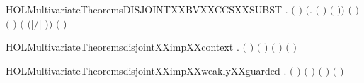 \newcommand{\HOLMultivariateTheoremscontextXXvar}{\UseVerbatim{HOLMultivariateTheoremscontextXXvar}}
\begin{SaveVerbatim}{HOLMultivariateTheoremsDISJOINTXXBVXXCCSXXSUBST}
\HOLTokenTurnstile{} \HOLSymConst{\HOLTokenForall{}}  .
         \HOLSymConst{\HOLTokenConj{}} \ensuremath{(}  \HOLSymConst{\ensuremath{=}}  \ensuremath{)} \HOLSymConst{\HOLTokenConj{}}
        \ensuremath{(}\HOLTokenLambda{}.  \ensuremath{(} \ensuremath{)} \ensuremath{(} \ensuremath{)}\ensuremath{)}  \HOLSymConst{\HOLTokenConj{}}
        \ensuremath{(} \ensuremath{)} \ensuremath{(} \ensuremath{)} \HOLSymConst{\HOLTokenImp{}}
        \ensuremath{(} \ensuremath{(}\ensuremath{[}\ensuremath{/}\ensuremath{]} \ensuremath{)}\ensuremath{)} \ensuremath{(} \ensuremath{)}
\end{SaveVerbatim}
\newcommand{\HOLMultivariateTheoremsDISJOINTXXBVXXCCSXXSUBST}{\UseVerbatim{HOLMultivariateTheoremsDISJOINTXXBVXXCCSXXSUBST}}
\begin{SaveVerbatim}{HOLMultivariateTheoremsdisjointXXimpXXcontext}
\HOLTokenTurnstile{} \HOLSymConst{\HOLTokenForall{}} .
        \ensuremath{(} \ensuremath{)} \ensuremath{(} \ensuremath{)} \HOLSymConst{\HOLTokenConj{}}  \ensuremath{(} \ensuremath{)} \ensuremath{(} \ensuremath{)} \HOLSymConst{\HOLTokenImp{}}
         
\end{SaveVerbatim}
\newcommand{\HOLMultivariateTheoremsdisjointXXimpXXcontext}{\UseVerbatim{HOLMultivariateTheoremsdisjointXXimpXXcontext}}
\begin{SaveVerbatim}{HOLMultivariateTheoremsdisjointXXimpXXweaklyXXguarded}
\HOLTokenTurnstile{} \HOLSymConst{\HOLTokenForall{}} .
        \ensuremath{(} \ensuremath{)} \ensuremath{(} \ensuremath{)} \HOLSymConst{\HOLTokenConj{}}  \ensuremath{(} \ensuremath{)} \ensuremath{(} \ensuremath{)} \HOLSymConst{\HOLTokenImp{}}
         
\end{SaveVerbatim}
